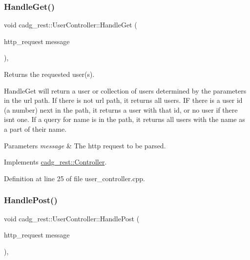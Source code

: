\subsubsection{\texorpdfstring{HandleGet()}{HandleGet()}}
{\footnotesize\ttfamily void cadg\+\_\+rest\+::\+User\+Controller\+::\+Handle\+Get (\begin{DoxyParamCaption}\item[{http\+\_\+request}]{message }\end{DoxyParamCaption})\hspace{0.3cm}{\ttfamily [override]}, {\ttfamily [virtual]}}



Returns the requested user(s). 

Handle\+Get will return a user or collection of users determined by the parameters in the url path. If there is not url path, it returns all users. IF there is a user id (a number) next in the path, it returns a user with that id, or no user if there isn\textquotesingle{}t one. If a query for name is in the path, it returns all users with the name as a part of their name.


\begin{DoxyParams}{Parameters}
{\em message} & The http request to be parsed. \\
\hline
\end{DoxyParams}


Implements \mbox{\hyperlink{classcadg__rest_1_1_controller_a7166c6b459b4886ec477abd9dee06159}{cadg\+\_\+rest\+::\+Controller}}.



Definition at line 25 of file user\+\_\+controller.\+cpp.

\mbox{\label{classcadg__rest_1_1_user_controller_a6c3307f7b6fd4dc0b697bc956503e478}} 
\subsubsection{\texorpdfstring{HandlePost()}{HandlePost()}}
{\footnotesize\ttfamily void cadg\+\_\+rest\+::\+User\+Controller\+::\+Handle\+Post (\begin{DoxyParamCaption}\item[{http\+\_\+request}]{message }\end{DoxyParamCaption})\hspace{0.3cm}{\ttfamily [override]}, {\ttfamily [virtual]}}



